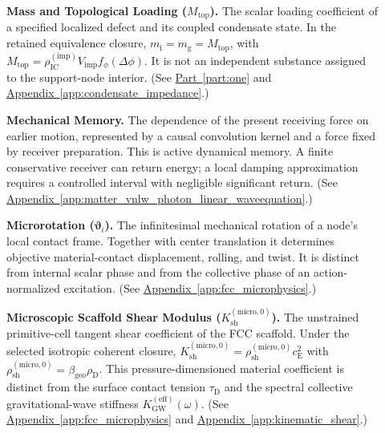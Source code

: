 \begin{description}
\item[] \begin{minipage}[t]{\linewidth}
\textbf{Mass and Topological Loading ($M_{\mathrm{top}}$).} The scalar loading coefficient of a specified localized defect and its coupled condensate state. In the retained equivalence closure, $m_{\mathrm i}=m_{\mathrm g}=M_{\mathrm{top}}$, with $M_{\mathrm{top}}=\rho_{\mathrm{IC}}^{(\mathrm{imp})}V_{\mathrm{imp}}f_\phi(\Delta\phi)$. It is not an independent substance assigned to the support-node interior.
(See \hyperref[part:one]{Part~\ref*{part:one}} and \hyperref[app:condensate_impedance]{Appendix~\ref*{app:condensate_impedance}}.)
\end{minipage}

\item[] \begin{minipage}[t]{\linewidth}
\textbf{Mechanical Memory.} The dependence of the present receiving force on earlier motion, represented by a causal convolution kernel and a force fixed by receiver preparation. This is active dynamical memory. A finite conservative receiver can return energy; a local damping approximation requires a controlled interval with negligible significant return.
(See \hyperref[app:matter_vnlw_photon_linear_waveequation]{Appendix~\ref*{app:matter_vnlw_photon_linear_waveequation}}.)
\end{minipage}

\item[] \begin{minipage}[t]{\linewidth}
\textbf{Microrotation ($\boldsymbol\vartheta_i$).} The infinitesimal mechanical rotation of a node's local contact frame. Together with center translation it determines objective material-contact displacement, rolling, and twist. It is distinct from internal scalar phase and from the collective phase of an action-normalized excitation.
(See \hyperref[app:fcc_microphysics]{Appendix~\ref*{app:fcc_microphysics}}.)
\end{minipage}

\item[] \begin{minipage}[t]{\linewidth}
\textbf{Microscopic Scaffold Shear Modulus ($K_{\mathrm{sh}}^{(\mathrm{micro},0)}$).} The unstrained primitive-cell tangent shear coefficient of the FCC scaffold. Under the selected isotropic coherent closure, $K_{\mathrm{sh}}^{(\mathrm{micro},0)}=\rho_{\mathrm{sh}}^{(\mathrm{micro},0)}c_{\mathrm E}^2$ with $\rho_{\mathrm{sh}}^{(\mathrm{micro},0)}=\beta_{\mathrm{geo}}\rho_{\mathrm D}$. This pressure-dimensioned material coefficient is distinct from the surface contact tension $\tau_{\mathrm D}$ and the spectral collective gravitational-wave stiffness $K_{\mathrm{GW}}^{(\mathrm{eff})}(\omega)$.
(See \hyperref[app:fcc_microphysics]{Appendix~\ref*{app:fcc_microphysics}} and \hyperref[app:kinematic_shear]{Appendix~\ref*{app:kinematic_shear}}.)
\end{minipage}


\end{description}
